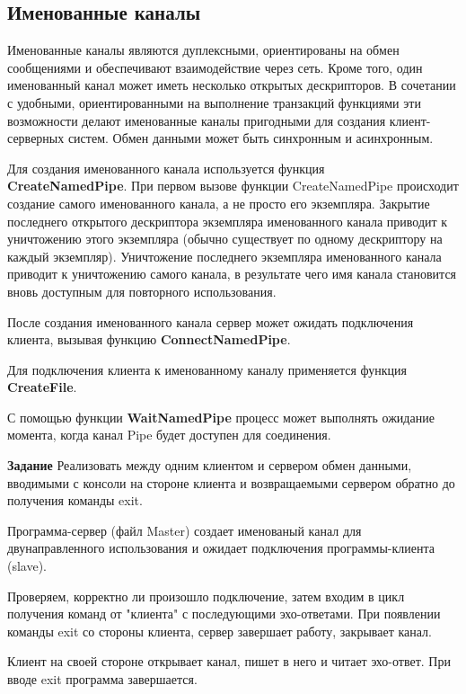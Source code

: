 \documentclass[a4paper]{article}
\begin{document}
\subsection{Именованные каналы}
	Именованные каналы являются дуплексными, ориентированы на обмен сообщениями и обеспечивают взаимодействие через сеть. Кроме того, один именованный канал может иметь несколько открытых дескрипторов. В сочетании с удобными, ориентированными на выполнение транзакций функциями эти возможности делают именованные каналы пригодными для создания клиент-серверных систем. Обмен данными может быть синхронным и асинхронным.
	
	Для создания именованного канала используется функция\\ \textbf{CreateNamedPipe}. При первом вызове функции CreateNamedPipe происходит создание самого именованного канала, а не просто его экземпляра. Закрытие последнего открытого дескриптора экземпляра именованного канала приводит к уничтожению этого экземпляра (обычно существует по одному дескриптору на каждый экземпляр). Уничтожение последнего экземпляра именованного канала приводит к уничтожению самого канала, в результате чего имя канала становится вновь доступным для повторного использования.
	
	После создания именованного канала сервер может ожидать подключения клиента, вызывая функцию \textbf{ConnectNamedPipe}.
	
	Для подключения клиента к именованному каналу применяется функция \textbf{CreateFile}.
	
	С помощью функции \textbf{WaitNamedPipe} процесс может выполнять ожидание момента, когда канал Pipe будет доступен для соединения.
	
	\textbf{Задание} Реализовать между одним клиентом и сервером обмен данными, вводимыми с консоли на стороне клиента и возвращаемыми сервером обратно до получения команды exit.

	Программа-сервер (файл Master) создает именованый канал для двунаправленного использования и ожидает подключения программы-клиента (slave).
	
	Проверяем, корректно ли произошло подключение, затем входим в цикл получения команд от "клиента" с последующими эхо-ответами. При появлении команды exit со стороны клиента, сервер завершает работу, закрывает канал.
	
	Клиент на своей стороне открывает канал, пишет в него и читает эхо-ответ. При вводе exit программа завершается.
	
\end{document}
